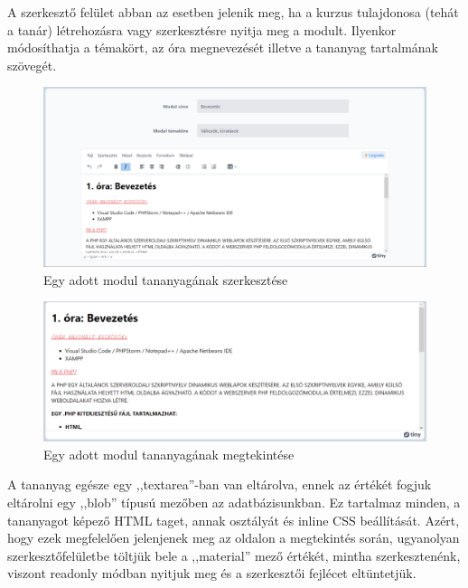 \documentclass[
]{thesis-ekf}
\theoremstyle{definition}
\theoremstyle{remark}
\begin{document}
            A szerkesztő felület abban az esetben jelenik meg, ha a kurzus tulajdonosa (tehát a tanár) létrehozásra vagy szerkesztésre nyitja meg a modult. Ilyenkor módosíthatja a témakört, az óra megnevezését illetve a tananyag tartalmának szövegét.
                \begin{figure}[ht!]
    		        \centering
    		        \includegraphics[width=15cm]{Modules.edit.png}
                        \caption{Egy adott modul tananyagának szerkesztése}
    		        \label{fig-modulok-edit}
    	    \end{figure}
                \begin{figure}[ht!]
    		        \centering
    		        \includegraphics[width=15cm]{Modules.show.png}
                        \caption{Egy adott modul tananyagának megtekintése}
    		        \label{fig-modulok-show}
    	    \end{figure}

            A tananyag egésze egy ,,textarea''-ban van eltárolva, ennek az értékét fogjuk eltárolni egy ,,blob'' típusú mezőben az adatbázisunkban. Ez tartalmaz minden, a tananyagot képező HTML taget, annak osztályát és inline CSS beállítását. Azért, hogy ezek megfelelően jelenjenek meg az oldalon a megtekintés során, ugyanolyan szerkesztőfelületbe töltjük bele a ,,material'' mező értékét, mintha szerkesztenénk, viszont readonly módban nyitjuk meg és a szerkesztői fejlécet eltüntetjük.
            
\end{document}
